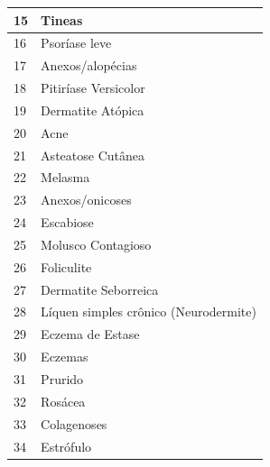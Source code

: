 \begin{table}[ht]
\begin{tabular}{l|l}
        15                 & Tineas                                                                   \\ \hline
        16                 & Psoríase leve                                                            \\ \hline
        17                 & Anexos/alopécias                                                         \\ \hline
        18                 & Pitiríase Versicolor                                                     \\ \hline
        19                 & Dermatite Atópica                                                        \\ \hline
        20                 & Acne                                                                     \\ \hline
        21                 & Asteatose Cutânea                                                        \\ \hline
        22                 & Melasma                                                                  \\ \hline
        23                 & Anexos/onicoses                                                          \\ \hline
        24                 & Escabiose                                                                \\ \hline
        25                 & Molusco Contagioso                                                       \\ \hline
        26                 & Foliculite                                                               \\ \hline
        27                 & Dermatite Seborreica                                                     \\ \hline
        28                 & Líquen simples crônico (Neurodermite)                                    \\ \hline
        29                 & Eczema de Estase                                                         \\ \hline
        30                 & Eczemas                                                                  \\ \hline
        31                 & Prurido                                                                  \\ \hline
        32                 & Rosácea                                                                  \\ \hline
        33                 & Colagenoses                                                              \\ \hline
        34                 & Estrófulo                                                                \\ \hline
    \end{tabular}
    \label{tab:skin_lesion_classes_legend}
\end{table}

